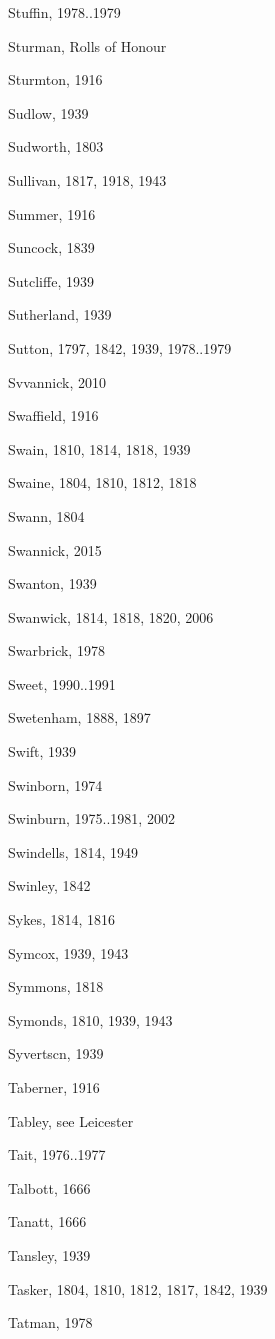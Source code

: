 {\begin{theindex}
\item Stuffin, 1978..1979
\item Sturman, Rolls of Honour
\item Sturmton, 1916
\item Sudlow, 1939
\item Sudworth, 1803
\item Sullivan, 1817, 1918, 1943
\item Summer, 1916
\item Suncock, 1839
\item Sutcliffe, 1939
\item Sutherland, 1939
\item Sutton, 1797, 1842, 1939, 1978..1979
\item Svvannick, 2010
\item Swaffield, 1916
\item Swain, 1810, 1814, 1818, 1939
\item Swaine, 1804, 1810, 1812, 1818
\item Swann, 1804
\item Swannick, 2015
\item Swanton, 1939
\item Swanwick, 1814, 1818, 1820, 2006
\item Swarbrick, 1978
\item Sweet, 1990..1991
\item Swetenham, 1888, 1897
\item Swift, 1939
\item Swinborn, 1974
\item Swinburn, 1975..1981, 2002
\item Swindells, 1814, 1949
\item Swinley, 1842
\item Sykes, 1814, 1816
\item Symcox, 1939, 1943
\item Symmons, 1818
\item Symonds, 1810, 1939, 1943
\item Syvertscn, 1939
\item Taberner, 1916
\item Tabley, see Leicester
\item Tait, 1976..1977
\item Talbott, 1666
\item Tanatt, 1666
\item Tansley, 1939
\item Tasker, 1804, 1810, 1812, 1817, 1842, 1939
\item Tatman, 1978

\end{theindex}}
